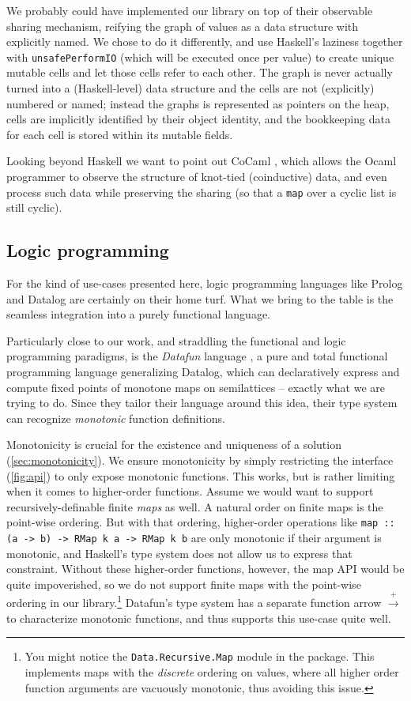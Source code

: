 \documentclass[manuscript,anonymous,screen,acmsmall]{acmart}
\begin{document}
We probably could have implemented our library on top of their observable sharing mechanism, reifying the graph of values as a data structure with explicitly named. We chose to do it differently, and use Haskell's laziness together with \verb|unsafePerformIO| (which will be executed once per value) to create unique mutable cells and let those cells refer to each other. The graph is never actually turned into a (Haskell-level) data structure and the cells are not (explicitly) numbered or named; instead the graphs is represented as pointers on the heap, cells are implicitly identified by their object identity, and the bookkeeping data for each cell is stored within its mutable fields.

Looking beyond Haskell we want to point out CoCaml \citep{cocaml}, which allows the Ocaml programmer to observe the structure of knot-tied (coinductive) data, and even process such data while preserving the sharing (so that a \verb|map| over a cyclic list is still cyclic).


\subsection{Logic programming}

For the kind of use-cases presented here, logic programming languages like Prolog and Datalog are certainly on their home turf. What we bring to the table is the seamless integration into a purely functional language.

Particularly close to our work, and straddling the functional and logic programming paradigms, is the \emph{Datafun} language \citep{datafun}, a pure and total functional programming language generalizing Datalog, which can declaratively express and compute fixed points of monotone maps on semilattices -- exactly what we are trying to do. Since they tailor their language around this idea, their type system can recognize \emph{monotonic} function definitions.

Monotonicity is crucial for the existence and uniqueness of a solution (\cref{sec:monotonicity}). We ensure monotonicity by simply restricting the interface (\cref{fig:api}) to only expose monotonic functions. This works, but is rather limiting when it comes to higher-order functions. Assume we would want to support recursively-definable finite \emph{maps} as well. A natural order on finite maps is the point-wise ordering. But with that ordering, higher-order operations like \verb|map :: (a -> b) -> RMap k a -> RMap k b| are only monotonic if their argument is monotonic, and Haskell's type system does not allow us to express that constraint. Without these higher-order functions, however, the map API would be quite impoverished, so we do not support finite maps with the point-wise ordering in our library.\footnote{You might notice the \texttt{Data.Recursive.Map} module in the package. This implements maps with the \emph{discrete} ordering on values, where all higher order function arguments are vacuously monotonic, thus avoiding this issue.} Datafun's type system has a separate function arrow $\xrightarrow{+}$ to characterize monotonic functions, and thus supports this use-case quite well.
\end{document}
